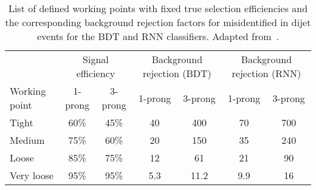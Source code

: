 \begin{table}
  \centering

  \begin{tabular}{lcccccc}
    \toprule
                  & \multicolumn{2}{c}{Signal efficiency} & \multicolumn{2}{c}{Background rejection (BDT)} & \multicolumn{2}{c}{Background rejection (RNN)} \\
    Working point  & 1-prong & 3-prong & 1-prong & 3-prong & 1-prong & 3-prong \\
    \midrule
    Tight          & 60\%    & 45\%    & 40      & 400  & 70   & 700 \\
    Medium         & 75\%    & 60\%    & 20      & 150  & 35   & 240 \\
    Loose          & 85\%    & 75\%    & 12      & 61   & 21   & 90  \\
    Very loose     & 95\%    & 95\%    & 5.3     & 11.2 & 9.9  & 16  \\
    \bottomrule
  \end{tabular}
  \caption{List of defined working points with fixed true \tauhadvis
    selection efficiencies and the corresponding background rejection
    factors for misidentified \tauhadvis in dijet events for the BDT
    and RNN classifiers. Adapted from~\cite{ATL-PHYS-PUB-2019-033}.}
  \label{tab:rnn_wps}
\end{table}

